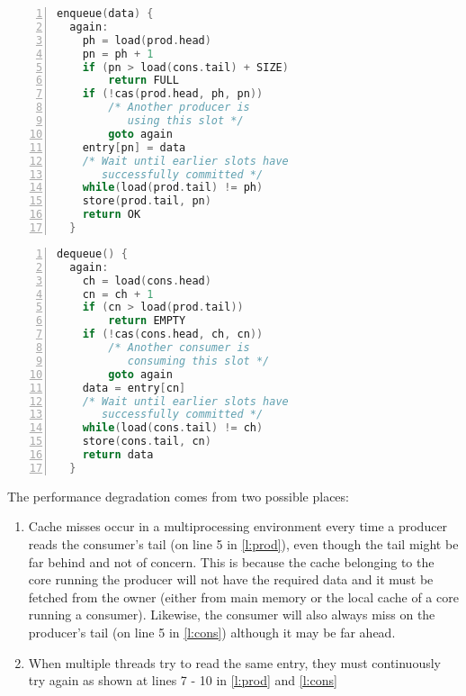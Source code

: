 \newpage
\noindent\begin{minipage}{.45\textwidth}
\fontsmall
\begin{lstlisting}[numbers=left, tabsize=2, language=C, caption={Producer pseudo code},frame=tb, label={l:prod}, captionpos=b]
  enqueue(data) {
  again:
  	ph = load(prod.head)
  	pn = ph + 1
  	if (pn > load(cons.tail) + SIZE)
  		return FULL
  	if (!cas(prod.head, ph, pn))
  		/* Another producer is 
  		   using this slot */
  		goto again
  	entry[pn] = data
  	/* Wait until earlier slots have
  	   successfully committed */
  	while(load(prod.tail) != ph)
  	store(prod.tail, pn)
  	return OK
  }
\end{lstlisting} 
\end{minipage}\hfill
\begin{minipage}{.45\textwidth}
\fontsmall
\begin{lstlisting}[numbers=left, tabsize=2, language=C, caption={Consumer pseudo code},frame=tb, label={l:cons}, captionpos=b]
  dequeue() {
  again:
  	ch = load(cons.head)
  	cn = ch + 1
  	if (cn > load(prod.tail))
  		return EMPTY
  	if (!cas(cons.head, ch, cn))
  		/* Another consumer is 
  		   consuming this slot */
  		goto again
  	data = entry[cn]
  	/* Wait until earlier slots have 
       successfully committed */
  	while(load(cons.tail) != ch)
  	store(cons.tail, cn)
  	return data
  }
\end{lstlisting}
\end{minipage}

The performance degradation comes from two possible places:
\begin{enumerate}
\item Cache misses occur in a multiprocessing environment every time a producer reads the
consumer's tail (on line 5 in \autoref{l:prod}), even though the tail might be far behind and not
of concern. This is because the cache belonging to the core running the producer will not have the
required data and it must be fetched from the owner (either from main memory or the local cache of
a core running a consumer). Likewise, the consumer will also always miss on the 
producer's tail (on line 5 in \autoref{l:cons}) although it may be far ahead.
\item When multiple threads try to read the same entry, they must continuously try again as shown at lines 7 - 10 in 
\autoref{l:prod} and \autoref{l:cons}
\end{enumerate}


